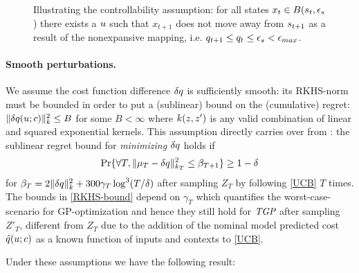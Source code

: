 \begin{figure}
	\centering
	\def\svgwidth{\columnwidth}
	
	\caption{Illustrating the controllability assumption: for all states $x_t \in B(s_t,\epsilon_s$) there exists a $u$ such that $x_{t+1}$ does not move away from $s_{t+1}$ as a result of the nonexpansive mapping, i.e. $q_{t+1} \leq q_{t} \leq \epsilon_s < \epsilon_{max}$.}
	\label{fig:drawing3}
\end{figure}

\paragraph{Smooth perturbations.} We assume the cost function difference $\delta q$ is sufficiently smooth: its RKHS-norm must be bounded in order to put a (sublinear) bound on the (cumulative) regret: $\|\delta q(u; c)\|_{k}^{2} \leq B$ for some $B < \infty$ where $k(z, z')$ is any valid combination of linear and squared exponential kernels. This assumption directly carries over from \cite{Krause11}: the sublinear regret bound for \emph{minimizing $\delta q$} holds if
\begin{align}
\text{Pr}\{\forall T, \|\mu_{T} - \delta q\|_{k_{T}}^{2} \leq \beta_{T+1} \} \geq 1 - \delta \label{RKHS-bound}
\end{align}
for $\beta_{T} = 2\|\delta q\|_{k}^{2} + 300\gamma_{T}\log^{3}(T/\delta)$ after sampling $Z_{T}$ by following \eqref{UCB} $T$ times. The bounds in \eqref{RKHS-bound} depend on $\gamma_T$ which quantifies the worst-case-scenario for GP-optimization and hence they still hold for $\emph{TGP}$ after sampling $Z'_{T}$, different from $Z_{T}$ due to the addition of the nominal model predicted cost $\hat{q}(u;c)$ as a known function of inputs and contexts to \eqref{UCB}.

Under these assumptions we have the following result: \\

